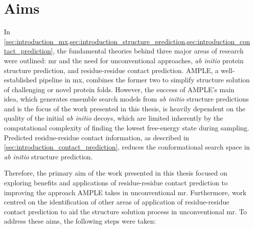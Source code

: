 \section{Aims}
In \cref{sec:introduction_mx,sec:introduction_structure_prediction,sec:introduction_contact_prediction}, the fundamental theories behind three major areas of research were outlined: \acrlong{mr} and the need for unconventional approaches, \textit{ab initio} protein structure prediction, and residue-residue contact prediction. AMPLE, a well-established pipeline in \gls{mx}, combines the former two to simplify structure solution of challenging or novel protein folds. However, the success of AMPLE's main idea, which generates ensemble search models from \textit{ab initio} structure predictions and is the focus of the work presented in this thesis, is heavily dependent on the quality of the initial \textit{ab initio} decoys, which are limited inherently by the computational complexity of finding the lowest free-energy state during sampling. Predicted residue-residue contact information, as described in \cref{sec:introduction_contact_prediction}, reduces the conformational search space in \textit{ab initio} structure prediction.

Therefore, the primary aim of the work presented in this thesis focused on exploring benefits and applications of residue-residue contact prediction to improving the approach AMPLE takes in unconventional \gls{mr}. Furthermore, work centred on the identification of other areas of application of residue-residue contact prediction to aid the structure solution process in unconventional \gls{mr}. To address these aims, the following steps were taken:

